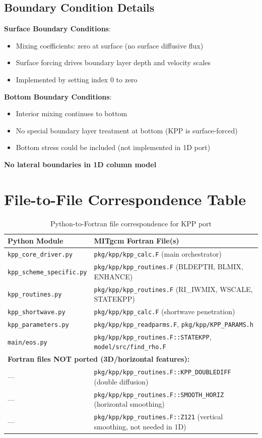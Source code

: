 \documentclass[11pt]{article}
\begin{document}
\subsection{Boundary Condition Details}

\textbf{Surface Boundary Conditions}:
\begin{itemize}
    \item Mixing coefficients: zero at surface (no surface diffusive flux)
    \item Surface forcing drives boundary layer depth and velocity scales
    \item Implemented by setting index 0 to zero
\end{itemize}

\textbf{Bottom Boundary Conditions}:
\begin{itemize}
    \item Interior mixing continues to bottom
    \item No special boundary layer treatment at bottom (KPP is surface-forced)
    \item Bottom stress could be included (not implemented in 1D port)
\end{itemize}

\textbf{No lateral boundaries in 1D column model}

\section{File-to-File Correspondence Table}
\label{sec:file_correspondence}

\begin{table}[h]
\centering
\small
\begin{tabular}{lp{6cm}}
\toprule
\textbf{Python Module} & \textbf{MITgcm Fortran File(s)} \\
\midrule
\verb|kpp_core_driver.py| & \verb|pkg/kpp/kpp_calc.F| (main orchestrator) \\
\verb|kpp_scheme_specific.py| & \verb|pkg/kpp/kpp_routines.F| (BLDEPTH, BLMIX, ENHANCE) \\
\verb|kpp_routines.py| & \verb|pkg/kpp/kpp_routines.F| (RI\_IWMIX, WSCALE, STATEKPP) \\
\verb|kpp_shortwave.py| & \verb|pkg/kpp/kpp_calc.F| (shortwave penetration) \\
\verb|kpp_parameters.py| & \verb|pkg/kpp/kpp_readparms.F|, \verb|pkg/kpp/KPP_PARAMS.h| \\
\verb|main/eos.py| & \verb|pkg/kpp/kpp_routines.F::STATEKPP|, \verb|model/src/find_rho.F| \\
\midrule
\multicolumn{2}{l}{\textbf{Fortran files NOT ported (3D/horizontal features):}} \\
— & \verb|pkg/kpp/kpp_routines.F::KPP_DOUBLEDIFF| (double diffusion) \\
— & \verb|pkg/kpp/kpp_routines.F::SMOOTH_HORIZ| (horizontal smoothing) \\
— & \verb|pkg/kpp/kpp_routines.F::Z121| (vertical smoothing, not needed in 1D) \\
\bottomrule
\end{tabular}
\caption{Python-to-Fortran file correspondence for KPP port}
\end{table}
\end{document}
